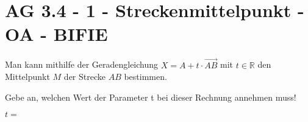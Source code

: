 \section{AG 3.4 - 1 - Streckenmittelpunkt - OA - BIFIE}

\begin{beispiel}[AG 3.4]{1} %
			Man kann mithilfe der Geradengleichung $X=A+t\cdot \overrightarrow{AB}$ mit $t\in \mathbb{R}$ den Mittelpunkt $M$ der Strecke $AB$ bestimmen.
	
	Gebe an, welchen Wert der Parameter t bei dieser Rechnung annehmen muss!
	\leer
	
	$t=$ 
\end{beispiel}